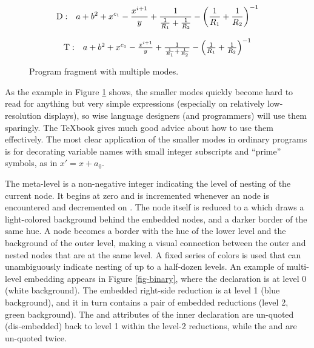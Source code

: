 \begin{figure}[h]
\begin{center}
\end{center}

$$
\mathrm{D:} \quad
a + b^2 + x^{c_1}
 - { x^{i+1} \over y }
 + { 1 \over { 1 \over R_1 }
 + { 1 \over R_2} }
 - \left({ 1 \over R_1 } + { 1 \over R_2}\right)^{-1}
$$

$$
\mathrm{T:} \quad
\textstyle
a + b^2 + x^{c_1}
 - { x^{i+1} \over y }
 + { 1 \over { 1 \over R_1 }
 + { 1 \over R_2} }
 - \left({ 1 \over R_1 } + { 1 \over R_2}\right)^{-1}
$$
\caption{\label{fig-modes} Program fragment with multiple modes.}
\end{figure}

As the example in Figure \ref{fig-modes} shows, the smaller modes quickly become hard to read for anything but very simple expressions (especially on relatively low-resolution displays), so wise language designers (and programmers) will use them sparingly. The \TeX book\cite{knuth} gives much good advice about how to use them effectively. The most clear application of the smaller modes in ordinary programs is for decorating variable names with small integer subscripts and ``prime'' symbols, as in $x' = x + a_0$.

The meta-level is a non-negative integer indicating the level of nesting of the current node. It begins at zero and is incremented whenever an  node is encountered and decremented on . The  node itself is reduced to a  which draws a light-colored background behind the embedded nodes, and a darker border of the same hue. A  node becomes a border with the hue of the lower level and the background of the outer level, making a visual connection between the outer and nested nodes that are at the same level. A fixed series of colors is used that can unambiguously indicate nesting of up to a half-dozen levels. An example of multi-level embedding appears in Figure \ref{fig-binary}, where the declaration is at level 0 (white background). The embedded right-side reduction is at level 1 (blue background), and it in turn contains a pair of embedded reductions (level 2, green background). The  and  attributes of the inner declaration are un-quoted (dis-embedded) back to level 1 within the level-2 reductions, while the  and  are un-quoted twice.

